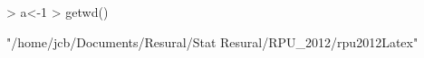 \documentclass{article}
\begin{document}

\begin{Schunk}
\begin{Sinput}
> a<-1
> getwd()
\end{Sinput}
\begin{Soutput}
[1] "/home/jcb/Documents/Resural/Stat Resural/RPU_2012/rpu2012Latex"
\end{Soutput}
\end{Schunk}
\end{document}
